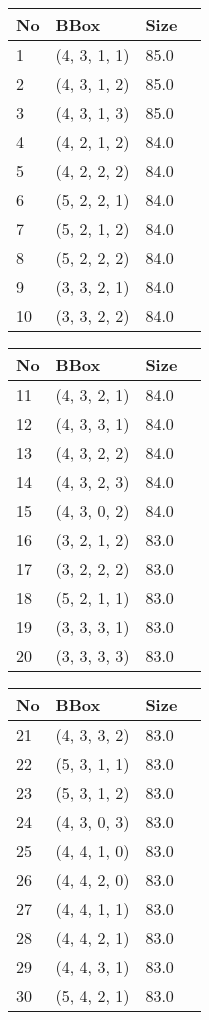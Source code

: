 %
    \begin{tabular}{|l|l|l|l|}
    \hline
    No & BBox & Size  \\
    \hline%
    
1&(4, 3, 1, 1)& 85.0\\
2&(4, 3, 1, 2)& 85.0\\
3&(4, 3, 1, 3)& 85.0\\
4&(4, 2, 1, 2)& 84.0\\
5&(4, 2, 2, 2)& 84.0\\
6&(5, 2, 2, 1)& 84.0\\
7&(5, 2, 1, 2)& 84.0\\
8&(5, 2, 2, 2)& 84.0\\
9&(3, 3, 2, 1)& 84.0\\
10&(3, 3, 2, 2)& 84.0\\
%
    \hline
    \end{tabular}%
\hspace*{5mm}
%
    \begin{tabular}{|l|l|l|l|}
    \hline
    No & BBox & Size  \\
    \hline%
    
11&(4, 3, 2, 1)& 84.0\\
12&(4, 3, 3, 1)& 84.0\\
13&(4, 3, 2, 2)& 84.0\\
14&(4, 3, 2, 3)& 84.0\\
15&(4, 3, 0, 2)& 84.0\\
16&(3, 2, 1, 2)& 83.0\\
17&(3, 2, 2, 2)& 83.0\\
18&(5, 2, 1, 1)& 83.0\\
19&(3, 3, 3, 1)& 83.0\\
20&(3, 3, 3, 3)& 83.0\\
%
    \hline
    \end{tabular}%
\hspace*{5mm}
%
    \begin{tabular}{|l|l|l|l|}
    \hline
    No & BBox & Size  \\
    \hline%
    
21&(4, 3, 3, 2)& 83.0\\
22&(5, 3, 1, 1)& 83.0\\
23&(5, 3, 1, 2)& 83.0\\
24&(4, 3, 0, 3)& 83.0\\
25&(4, 4, 1, 0)& 83.0\\
26&(4, 4, 2, 0)& 83.0\\
27&(4, 4, 1, 1)& 83.0\\
28&(4, 4, 2, 1)& 83.0\\
29&(4, 4, 3, 1)& 83.0\\
30&(5, 4, 2, 1)& 83.0\\
%
    \hline
    \end{tabular}%

